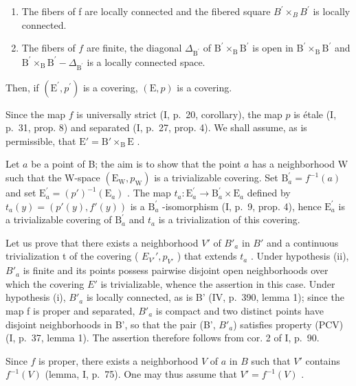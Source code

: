 \begin{enumerate}
\def\labelenumi{(\roman{enumi})}
\item
  The fibers of f are locally connected and the fibered square \(B^{\prime} \times_{B} B^{\prime}\) is locally connected.
\item
  The fibers of \(f\) are finite, the diagonal \(\Delta_{\mathrm{B}^{\prime}}\) of \(\mathrm{B}^{\prime}\times_{\mathrm{B}}\mathrm{B}^{\prime}\) is open in \(\mathrm{B}^{\prime}\times_{\mathrm{B}}\mathrm{B}^{\prime}\) and \(\mathrm{B}^{\prime}\times_{\mathrm{B}}\mathrm{B}^{\prime} - \Delta_{\mathrm{B}^{\prime}}\) is a locally connected space.
\end{enumerate}

Then, if \((\mathrm{E}^{\prime}, p^{\prime})\) is a covering, \((\mathrm{E}, p)\) is a covering.

Since the map \(f\) is universally strict (I, p.~20, corollary), the map \(p\) is étale (I, p.~31, prop. 8) and separated (I, p.~27, prop. 4). We shall assume, as is permissible, that \(\mathrm{E}' = \mathrm{B}' \times_{\mathrm{B}} \mathrm{E}\) .

Let \(a\) be a point of B; the aim is to show that the point \(a\) has a neighborhood W such that the W-space \((\mathrm{E_W}, p_{\mathrm{W}})\) is a trivializable covering. Set \(\mathrm{B}_a^\prime = f^{-1}(a)\) and set \(\mathrm{E}_a^\prime = (p')^{-1}(\mathrm{E}_a)\) . The map \(t_a: \mathrm{E}_a^\prime \to \mathrm{B}_a^\prime \times \mathrm{E}_a\) defined by \(t_a(y) = (p'(y), f'(y))\) is a \(\mathrm{B}_a^\prime\) -isomorphism (I, p.~9, prop. 4), hence \(\mathrm{E}_a^\prime\) is a trivializable covering of \(\mathrm{B}_a^\prime\) and \(t_a\) is a trivialization of this covering.

Let us prove that there exists a neighborhood \(V'\) of \(B'_{a}\) in \(B'\) and a continuous trivialization t of the covering ( \(E_{V'}', p_{V'}\) ) that extends \(t_{a}\) . Under hypothesis (ii), \(B'_{a}\) is finite and its points possess pairwise disjoint open neighborhoods over which the covering \(E'\) is trivializable, whence the assertion in this case. Under hypothesis (i), \(B'_{a}\) is locally connected, as is B' (IV, p.~390, lemma 1); since the map f is proper and separated, \(B'_{a}\) is compact and two distinct points have disjoint neighborhoods in B', so that the pair (B', \(B'_{a}\)) satisfies property (PCV) (I, p.~37, lemma 1). The assertion therefore follows from cor. 2 of I, p.~90.

Since \(f\) is proper, there exists a neighborhood \(V\) of \(a\) in \(B\) such that \(V'\) contains \(f^{-1}(V)\) (lemma, I, p.~75). One may thus assume that \(V' = f^{-1}(V)\) .

